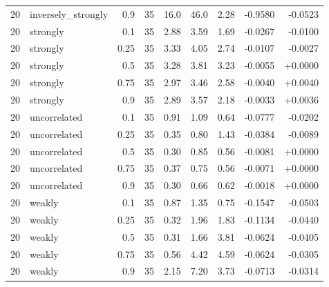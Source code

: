 \begin{tabular}{rlrrrrrrr}
20 & inversely\_strongly & 0.9 & 35 & 16.0 & 46.0 & 2.28 & -0.9580 & -0.0523 \\
20 & strongly & 0.1 & 35 & 2.88 & 3.59 & 1.69 & -0.0267 & -0.0100 \\
20 & strongly & 0.25 & 35 & 3.33 & 4.05 & 2.74 & -0.0107 & -0.0027 \\
20 & strongly & 0.5 & 35 & 3.28 & 3.81 & 3.23 & -0.0055 & +0.0000 \\
20 & strongly & 0.75 & 35 & 2.97 & 3.46 & 2.58 & -0.0040 & +0.0040 \\
20 & strongly & 0.9 & 35 & 2.89 & 3.57 & 2.18 & -0.0033 & +0.0036 \\
20 & uncorrelated & 0.1 & 35 & 0.91 & 1.09 & 0.64 & -0.0777 & -0.0202 \\
20 & uncorrelated & 0.25 & 35 & 0.35 & 0.80 & 1.43 & -0.0384 & -0.0089 \\
20 & uncorrelated & 0.5 & 35 & 0.30 & 0.85 & 0.56 & -0.0081 & +0.0000 \\
20 & uncorrelated & 0.75 & 35 & 0.37 & 0.75 & 0.56 & -0.0071 & +0.0000 \\
20 & uncorrelated & 0.9 & 35 & 0.30 & 0.66 & 0.62 & -0.0018 & +0.0000 \\
20 & weakly & 0.1 & 35 & 0.87 & 1.35 & 0.75 & -0.1547 & -0.0503 \\
20 & weakly & 0.25 & 35 & 0.32 & 1.96 & 1.83 & -0.1134 & -0.0440 \\
20 & weakly & 0.5 & 35 & 0.31 & 1.66 & 3.81 & -0.0624 & -0.0405 \\
20 & weakly & 0.75 & 35 & 0.56 & 4.42 & 4.59 & -0.0624 & -0.0305 \\
20 & weakly & 0.9 & 35 & 2.15 & 7.20 & 3.73 & -0.0713 & -0.0314 \\
\hline
\end{tabular}
